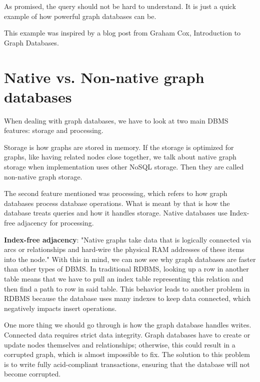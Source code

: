 
As promised, the query should not be hard to understand. It is just a quick example of how powerful graph databases can be.

This example was inspired by a blog post from Graham Cox, Introduction to Graph Databases. \cite{cox_introduction_2017}

\section {Native vs. Non-native graph databases}

When dealing with graph databases, we have to look at two main DBMS features: storage and processing.

Storage is how graphs are stored in memory. If the storage is optimized for graphs, like having related nodes close together, we talk about native graph storage when implementation uses other NoSQL storage. Then they are called non-native graph storage.

The second feature mentioned was processing, which refers to how graph databases process database operations. What is meant by that is how the database treats queries and how it handles storage. Native databases use Index-free adjacency for processing.
\cite{chao_graph_2018}

\textbf{Index-free adjacency}: "Native graphs take data that is logically connected via arcs or relationships and hard-wire the physical RAM addresses of these items into the node."
\cite{mccreary_neighborhood_2021} With this in mind, we can now see why graph databases are faster than other types of DBMS.
In traditional RDBMS, looking up a row in another table means that we have to pull an index table representing this relation and then find a path to row in said table.
This behavior leads to another problem in RDBMS because the database uses many indexes to keep data connected, which negatively impacts insert operations.

One more thing we should go through is how the graph database handles writes. Connected data requires strict data integrity.
Graph databases have to create or update nodes themselves and relationships; otherwise, this could result in a corrupted graph, which is almost impossible to fix.
The solution to this problem is to write fully \acrshort{acid}-compliant transactions, ensuring that the database will not become corrupted.
\cite{chao_graph_2018}

